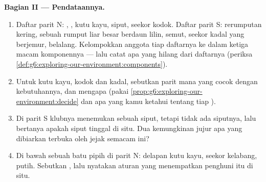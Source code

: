 \begin{problem}
\medskip\noindent\textbf{Bagian II --- Pendataannya.}
\begin{enumerate}[resume]
  \item Daftar parit N: , , kutu kayu, siput, seekor
        kodok. Daftar parit S: rerumputan kering, sebuah rumput liar
        besar berdaun lilin, semut, seekor kadal yang berjemur,
        belalang. Kelompokkan anggota tiap daftarnya ke dalam ketiga
        macam komponennya --- lalu catat apa yang hilang dari
        daftarnya (periksa
        \cref{def:g6:exploring-our-environment:components}).
  \item Untuk kutu kayu, kodok dan kadal, sebutkan  parit mana
        yang cocok dengan kebutuhannya, dan mengapa (pakai
        \cref{prop:g6:exploring-our-environment:decide} dan apa yang
        kamu ketahui tentang tiap ).
  \item Di parit S klubnya menemukan sebuah  siput, tetapi
        tidak ada siputnya, lalu bertanya apakah siput tinggal di
        situ. Dua kemungkinan jujur apa yang dibiarkan terbuka oleh
        jejak semacam ini?
  \item Di bawah sebuah batu pipih di parit N: delapan kutu kayu,
        seekor kelabang,  putih. Sebutkan 
        , lalu nyatakan aturan yang menempatkan
        penghuni itu di situ.
\end{enumerate}


\end{problem}
